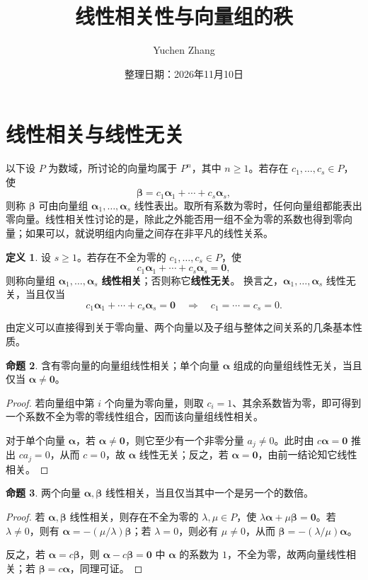 \documentclass[UTF8, fontset=fandol, a4paper, 12pt]{ctexart}
\title{线性相关性与向量组的秩}
\author{Yuchen Zhang}
\date{整理日期：2026年11月10日}
\makeatletter
\newcommand{\va}{\boldsymbol\alpha}
\newcommand{\vb}{\boldsymbol\beta}
\newcommand{\vo}{\boldsymbol0}
\theoremstyle{definition}
\newtheorem{definition}{定义}[section]
\newtheorem{proposition}[definition]{命题}
\renewcommand{\maketitle}{%
  \begin{center}
    {\LARGE\bfseries \@title\par}\vspace{0.6em}
    \@author\par\vspace{0.2em}
    {\small \@date\par}
  \end{center}
}
\makeatother
\begin{document}
\maketitle

\section{线性相关与线性无关}

以下设 $P$ 为数域，所讨论的向量均属于 $P^n$，其中 $n\ge1$。若存在 $c_1,\ldots,c_s\in P$，使
\[
 \vb=c_1\va_1+\cdots+c_s\va_s,
\]
则称 $\vb$ 可由向量组 $\va_1,\ldots,\va_s$ 线性表出。取所有系数为零时，任何向量组都能表出零向量。线性相关性讨论的是，除此之外能否用一组不全为零的系数也得到零向量；如果可以，就说明组内向量之间存在非平凡的线性关系。

\begin{definition}
设 $s\ge1$。若存在不全为零的 $c_1,\ldots,c_s\in P$，使
\[
 c_1\va_1+\cdots+c_s\va_s=\vo,
\]
则称向量组 $\va_1,\ldots,\va_s$ \textbf{线性相关}；否则称它\textbf{线性无关}。
换言之，$\va_1,\ldots,\va_s$ 线性无关，当且仅当
\[
 c_1\va_1+\cdots+c_s\va_s=\vo
 \quad\Longrightarrow\quad c_1=\cdots=c_s=0.
\]
\end{definition}

由定义可以直接得到关于零向量、两个向量以及子组与整体之间关系的几条基本性质。

\begin{proposition}
含有零向量的向量组线性相关；单个向量 $\va$ 组成的向量组线性无关，当且仅当 $\va\ne\vo$。
\end{proposition}
\begin{proof}
若向量组中第 $i$ 个向量为零向量，则取 $c_i=1$、其余系数皆为零，即可得到一个系数不全为零的零线性组合，因而该向量组线性相关。

对于单个向量 $\va$，若 $\va\ne\vo$，则它至少有一个非零分量 $a_j\ne0$。此时由 $c\va=\vo$ 推出 $ca_j=0$，从而 $c=0$，故 $\va$ 线性无关；反之，若 $\va=\vo$，由前一结论知它线性相关。
\end{proof}

\begin{proposition}
两个向量 $\va,\vb$ 线性相关，当且仅当其中一个是另一个的数倍。
\end{proposition}
\begin{proof}
若 $\va,\vb$ 线性相关，则存在不全为零的 $\lambda,\mu\in P$，使 $\lambda\va+\mu\vb=\vo$。若 $\lambda\ne0$，则有 $\va=-(\mu/\lambda)\vb$；若 $\lambda=0$，则必有 $\mu\ne0$，从而 $\vb=-(\lambda/\mu)\va$。

反之，若 $\va=c\vb$，则 $\va-c\vb=\vo$ 中 $\va$ 的系数为 $1$，不全为零，故两向量线性相关；若 $\vb=c\va$，同理可证。
\end{proof}
\end{document}
